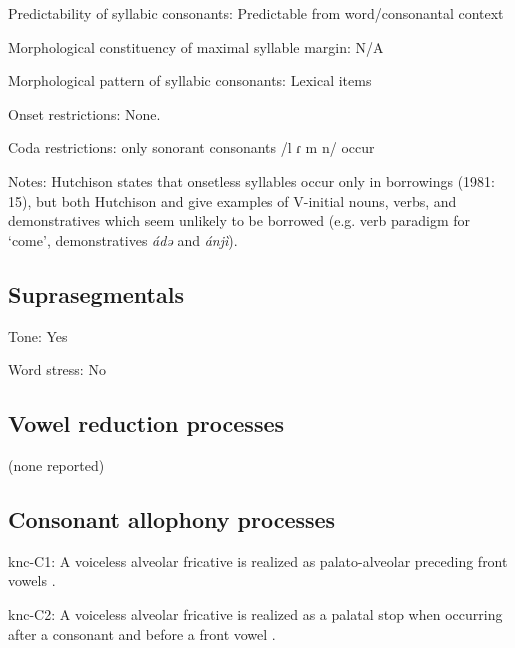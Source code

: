 {\begin{appendixdesc}
\item[Predictability of syllabic consonants:] Predictable from word/consonantal context

\item[Morphological constituency of maximal syllable margin:] N/A

\item[Morphological pattern of syllabic consonants:] Lexical items

\item[Onset restrictions:] None.

\item[Coda restrictions:] only sonorant consonants /l ɾ m n/ occur \citep[15]{Hutchison1981}

\item[Notes:] Hutchison states that onsetless syllables occur only in borrowings (1981: 15), but both Hutchison and \citet{Cyffer1998} give examples of V-initial nouns, verbs, and demonstratives which seem unlikely to be borrowed (e.g. verb paradigm for ‘come’, demonstratives \textit{ádə} and \textit{ánjì}).
\end{appendixdesc}
\subsection*{Suprasegmentals}
\begin{appendixdesc}
\item[Tone:] Yes

\item[Word stress:] No
\end{appendixdesc}
\subsection*{Vowel reduction processes}

(none reported)
\subsection*{Consonant allophony processes}
\begin{appendixdesc}

\item[knc-C1:] A voiceless alveolar fricative is realized as palato-alveolar preceding front vowels \citep[20]{Cyffer1998}.

\item[knc-C2:] A voiceless alveolar fricative is realized as a palatal stop when occurring after a consonant and before a front vowel \citep[21]{Cyffer1998}.


\end{appendixdesc}}
